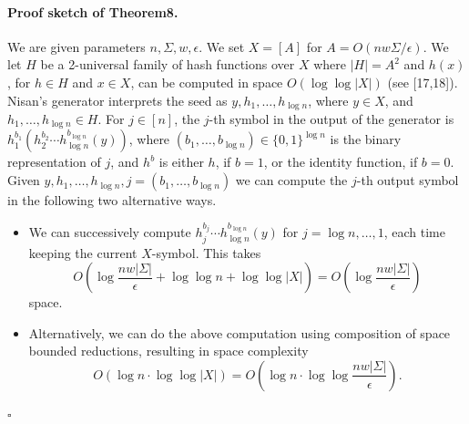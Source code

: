 \paragraph{Proof sketch of Theorem8.}
We are given parameters $n,\Sigma,w,\epsilon$. We set $X=[A]$ for $A=O(nw\Sigma/\epsilon)$. We let $H$ be a 2-universal family of hash functions over $X$ where $|H|=A^2$ and $h(x)$, for $h\in H$ and $x\in X$, can be computed in space $O(\log\log|X|)$ (see [17,18]).
Nisan's generator interprets the seed as $y,h_1,\ldots,h_{\log n}$, where $y\in X$, and $h_1,\ldots,h_{\log n}\in H$. For $j\in[n]$, the $j$-th symbol in the output of the generator is $h_1^{b_1}(h_2^{b_2}\cdots h_{\log n}^{b_{\log n}}(y))$, where $(b_1,\ldots,b_{\log n})\in\{0,1\}^{\log n}$ is the binary representation of $j$, and $h^b$ is either $h$, if $b=1$, or the identity function, if $b=0$. Given $y,h_1,\ldots,h_{\log n},j=(b_1,\ldots,b_{\log n})$ we can compute the $j$-th output symbol in the following two alternative ways.
\begin{itemize}
\item We can successively compute $h_j^{b_j}\cdots h_{\log n}^{b_{\log n}}(y)$ for $j=\log n,\ldots,1$, each time keeping the current $X$-symbol. This takes
\[O\left(\log\frac{nw|\Sigma|}\epsilon+\log\log n+\log\log|X|\right)=O\left(\log\frac{nw|\Sigma|}\epsilon\right)\]
space.
\item Alternatively, we can do the above computation using composition of space bounded reductions, resulting in space complexity
\[O(\log n\cdot\log\log|X|)=O\left(\log n\cdot\log\log\frac{nw|\Sigma|}\epsilon\right).\]
\end{itemize}
\hfill$\square$
